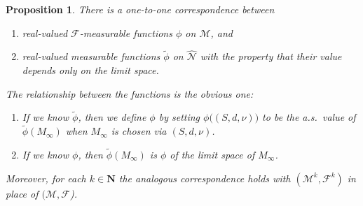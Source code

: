 \documentclass[10pt]{amsart}
\let\mathcal\mathscr
\theoremstyle{plain}
\numberwithin{theorem}{section}
\newtheorem{proposition}[theorem]{Proposition}
\theoremstyle{definition}
\newcommand\mmspace{{\mathcal M}}
\newcommand\mmsigma{{\mathcal F}}
\newcommand{\matrixmspace}{\mathcal N}
\newcommand{\N}{\mathbf{N}}
\let\wt\widetilde
\begin{document}
\begin{proposition}
\label{prop::measurability_correspondence}
There is a one-to-one correspondence between
\begin{enumerate}
\item real-valued $\mmsigma$-measurable functions $\phi$ on $\mmspace$, and
\item real-valued measurable functions $\wt \phi$ on $\widehat {\matrixmspace}$ with the property that their value depends only on the limit space.
\end{enumerate}
The relationship between the functions is the obvious one:
\begin{enumerate}
\item If we know $\wt \phi$, then we define $\phi$ by setting $\phi\bigl( (S,d,\nu) \bigr)$ to be the a.s.\ value of $\wt \phi (M_\infty)$ when $M_\infty$ is chosen via $(S,d,\nu)$.
\item If we know $\phi$, then $\wt \phi(M_\infty)$ is $\phi$ of the limit space of $M_\infty$.
\end{enumerate}
Moreover, for each $k \in \N$ the analogous correspondence holds with $(\mmspace^k,\mmsigma^k)$ in place of $(\mmspace,\mmsigma$).
\end{proposition}
\end{document}

